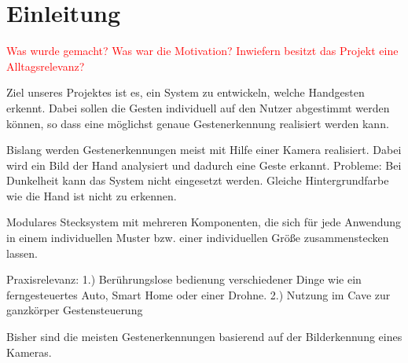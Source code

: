 \chapter{Einleitung}
\label{ch:Einleitung}

\textcolor{red}{Was wurde gemacht? Was war die Motivation? Inwiefern besitzt das Projekt eine Alltagsrelevanz?}

Ziel unseres Projektes ist es, ein System zu entwickeln, welche Handgesten erkennt. Dabei sollen die Gesten individuell auf den Nutzer abgestimmt werden können, so dass eine möglichst genaue Gestenerkennung realisiert werden kann.

Bislang werden Gestenerkennungen meist mit Hilfe einer Kamera realisiert. Dabei wird ein Bild der Hand analysiert und dadurch eine Geste erkannt. Probleme: Bei Dunkelheit kann das System nicht eingesetzt werden. Gleiche Hintergrundfarbe wie die Hand ist nicht zu erkennen. 

Modulares Stecksystem mit mehreren Komponenten, die sich für jede Anwendung in einem individuellen Muster bzw. einer individuellen Größe zusammenstecken lassen.

Praxisrelevanz: 
1.) Berührungslose bedienung verschiedener Dinge wie ein ferngesteuertes Auto, Smart Home oder einer Drohne. 
2.) Nutzung im Cave zur ganzkörper Gestensteuerung

Bisher sind die meisten Gestenerkennungen basierend auf der Bilderkennung eines Kameras.